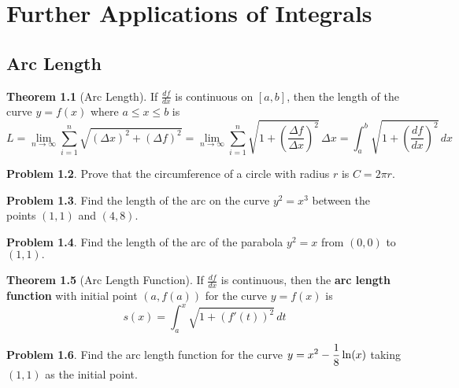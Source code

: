 \documentclass[letterpaper, twoside, 12pt]{book}
\theoremstyle{definition}
\newtheorem{theorem}{Theorem}
\theoremstyle{definition}
\newtheorem{problem}[theorem]{Problem}
\newcommand{\ds}{\ensuremath{\displaystyle}}
\begin{document}
\setcounter{chapter}{7}

\chapter{Further Applications of Integrals}

\section{Arc Length}

\begin{theorem}[Arc Length]
  If $\frac{df}{dx}$ is continuous on $\left[a,b\right]$, then the length of the
  curve $y = f(x)$ where $a \leq x \leq b$ is
  \[
    L
      =
    \lim_{n\to\infty}\sum_{i=1}^n \sqrt{(\Delta x)^2+(\Delta f)^2}
      =
    \lim_{n\to\infty}\sum_{i=1}^n
    \sqrt{1+\left(\frac{\Delta f}{\Delta x}\right)^2}\,\Delta x
      =
    \int_a^b \sqrt{1+\left(\frac{df}{dx}\right)^2} \, dx
  \]
\end{theorem}

\begin{problem}
  Prove that the circumference of a circle with radius $r$ is
  $C=2\pi r$.
\end{problem}

\vfill

\begin{problem}
  Find the length of the arc on the curve $y^2 = x^3$ between
  the points $(1,1)$ and $(4,8)$.
\end{problem}

\vfill

\newpage

\begin{problem}
 Find the length of the arc of the parabola $y^2=x$ from $(0,0)$ to $(1,1).$
\end{problem}

\vfill

\begin{theorem}[Arc Length Function]
  If $\frac{df}{dx}$ is continuous, then the \textbf{arc length function} with
  initial point $(a,f(a))$ for the curve $y = f(x)$ is
  \[
    s(x)
      =
    \int_a^x \sqrt{1+\left(f'(t)\right)^2} \, dt
  \]
\end{theorem}

\begin{problem}
 Find the arc length function for the curve $\ds y = x^2-\frac{1}{8}\ln(x)$
 taking $(1,1)$ as the initial point.
\end{problem}
\end{document}

